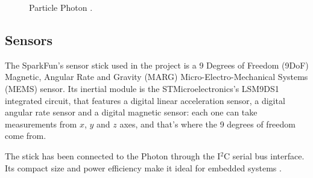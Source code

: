 \begin{center}
	\begin{figure}[ht]
		\caption{Particle Photon \cite{Photon}.}
	\end{figure}
\end{center}

\subsection{Sensors}
The SparkFun's sensor stick used in the project is a 9 Degrees of Freedom (9DoF) Magnetic, Angular Rate and Gravity (MARG) Micro-Electro-Mechanical Systems (MEMS) sensor. Its inertial module is the STMicroelectronics's LSM9DS1 integrated circuit, that features a digital linear acceleration sensor, a digital angular rate sensor and a digital magnetic sensor: each one can take measurements from $x$, $y$ and $z$ axes, and that's where the 9 degrees of freedom come from.

The stick has been connected to the Photon through the I$^2$C serial bus interface. Its compact size and power efficiency make it ideal for embedded systems \cite{SensorDatasheet}.

